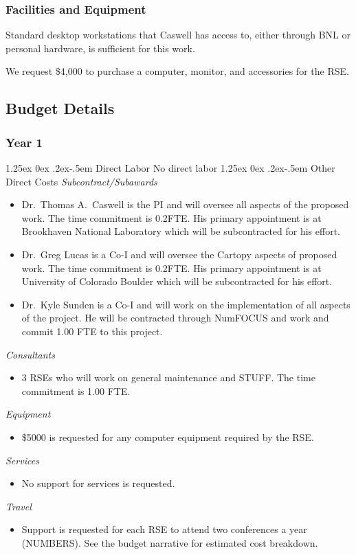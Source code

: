 \documentclass[12pt]{article}
\makeatletter
\numberwithin{page}{section}
\renewcommand{\paragraph}{%
  \@startsection{paragraph}{4}%
  {\z@}{1.25ex \@plus 0ex \@minus .2ex}{-.5em}%
  {\normalfont\normalsize\itshape\bfseries}%
}
\makeatother
\begin{document}
\subsubsection{Facilities and Equipment}

Standard desktop workstations that Caswell has access to, either
through BNL or personal hardware, is sufficient for this work.

We request \$4,000 to purchase a computer, monitor, and accessories
for the RSE.

\subsection{Budget Details}
\subsubsection{Year 1}
\paragraph{Direct Labor}
No direct labor
\paragraph{Other Direct Costs}
\textit{Subcontract/Subawards}
\begin{itemize}
  \item Dr.\ Thomas A.\ Caswell is the PI and will oversee all aspects of the
  proposed work.  The time commitment is 0.2FTE.  His primary
  appointment is at Brookhaven National Laboratory which will be
  subcontracted for his effort.
\item Dr.\ Greg Lucas is a Co-I and will oversee the Cartopy aspects of
  proposed work.  The time commitment is 0.2FTE.  His primary appointment is at
  University of Colorado Boulder which will be subcontracted for his effort.
\item Dr.\ Kyle Sunden is a Co-I and will work on the implementation of all
  aspects of the project.  He will be contracted through NumFOCUS and work and
  commit 1.00 FTE to this project.
\end{itemize}
\textit{Consultants}
\begin{itemize}
\item 3 RSEs who will work on general maintenance and STUFF.  The time commitment is 1.00
  FTE.
\end{itemize}
\textit{Equipment}
\begin{itemize}
\item \$5000 is requested for any computer equipment required by the RSE.
\end{itemize}
\textit{Services}
\begin{itemize}
\item No support for services is requested.
\end{itemize}
\textit{Travel}
\begin{itemize}
\item Support is requested for each RSE to attend two conferences a
  year (NUMBERS).  See the budget narrative for estimated cost
  breakdown.
\end{itemize}
\end{document}
